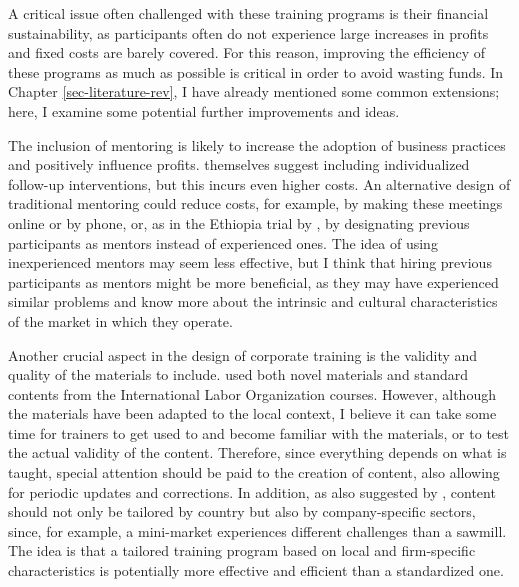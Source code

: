 A critical issue often challenged with these training programs is their financial sustainability, as participants often do not experience large increases in profits and fixed costs are barely covered. For this reason, improving the efficiency of these programs as much as possible is critical in order to avoid wasting funds. In Chapter \ref{sec-literature-rev}, I have already mentioned some common extensions; here, I examine some potential further improvements and ideas.

The inclusion of mentoring is likely to increase the adoption of business practices and positively influence profits. \cite{Ubfal2022} themselves suggest including individualized follow-up interventions, but this incurs even higher costs. An alternative design of traditional mentoring could reduce costs, for example, by making these meetings online or by phone, or, as in the Ethiopia trial by \cite{Bakhtiar2022}, by designating previous participants as mentors instead of experienced ones. The idea of using inexperienced mentors may seem less effective, but I think that hiring previous participants as mentors might be more beneficial, as they may have experienced similar problems and know more about the intrinsic and cultural characteristics of the market in which they operate.

Another crucial aspect in the design of corporate training is the validity and quality of the materials to include. \cite{Ubfal2022} used both novel materials and standard contents from the International Labor Organization courses. However, although the materials have been adapted to the local context, I believe it can take some time for trainers to get used to and become familiar with the materials, or to test the actual validity of the content. Therefore, since everything depends on what is taught, special attention should be paid to the creation of content, also allowing for periodic updates and corrections. In addition, as also suggested by \cite{McKenzie2020}, content should not only be tailored by country but also by company-specific sectors, since, for example, a mini-market experiences different challenges than a sawmill. The idea is that a tailored training program based on local and firm-specific characteristics is potentially more effective and efficient than a standardized one.

